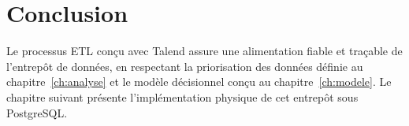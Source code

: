 \section{Conclusion}
Le processus ETL conçu avec Talend assure une alimentation fiable et traçable de l'entrepôt de données, en respectant la priorisation des données définie au chapitre~\ref{ch:analyse} et le modèle décisionnel conçu au chapitre~\ref{ch:modele}. Le chapitre suivant présente l'implémentation physique de cet entrepôt sous PostgreSQL.

\clearpage
